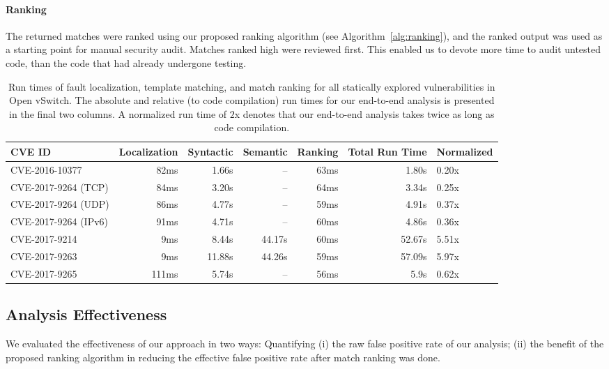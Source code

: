 \paragraph{Ranking}
The returned matches were ranked using our proposed ranking algorithm (see Algorithm~\ref{alg:ranking}), and the ranked output was used as a starting point for manual security audit.
Matches ranked high were reviewed first.
This enabled us to devote more time to audit untested code, than the code that had already undergone testing.

\begin{table*}[!tbh]
  \centering
  \begin{tabular}{lrrrrrp{2cm}}
  \toprule
  CVE ID & Localization & Syntactic & Semantic & Ranking & Total Run Time & Normalized \\
  \toprule
  CVE-2016-10377 & 82ms & 1.66s & -- & 63ms & 1.80s & 0.20x \\
  CVE-2017-9264 (TCP)  & 84ms & 3.20s & -- & 64ms & 3.34s & 0.25x \\
  CVE-2017-9264 (UDP) & 86ms & 4.77s & -- & 59ms & 4.91s & 0.37x\\
  CVE-2017-9264 (IPv6) & 91ms & 4.71s & -- & 60ms & 4.86s & 0.36x\\
  CVE-2017-9214 & 9ms & 8.44s & 44.17s & 60ms & 52.67s & 5.51x \\
  CVE-2017-9263 & 9ms & 11.88s & 44.26s & 59ms & 57.09s & 5.97x \\
  CVE-2017-9265 & 111ms & 5.74s & -- & 56ms & 5.9s & 0.62x\\
  \bottomrule
  \end{tabular}
  \caption{Run times of fault localization, template matching, and match ranking for all statically explored vulnerabilities in Open vSwitch. The absolute and relative (to code compilation) run times for our end-to-end analysis is presented in the final two columns. A normalized run time of $2$x denotes that our end-to-end analysis takes twice as long as code compilation.}
  \label{tab:runtime}
\end{table*}

\subsection{Analysis Effectiveness}

We evaluated the effectiveness of our approach in two ways: Quantifying (i) the raw false positive rate of our analysis; (ii) the benefit of the proposed ranking algorithm in reducing the effective false positive rate after match ranking was done.

